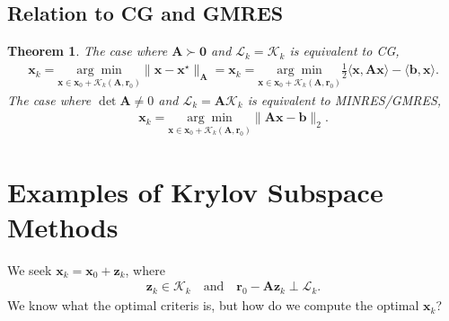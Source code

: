 \documentclass[12pt,a4paper]{article} %
\newtheorem*{theorem}{Theorem}
\begin{document}
\subsection{Relation to CG and GMRES}
\begin{theorem}
    The case where $\mathbf A \succ \bm 0$ and $\mathcal L_k = \mathcal K_k$
    is equivalent to CG, 
    \begin{align*}
        \bm x_k = \underset{\bm x \in \bm x_0 + \mathcal K_k(\mathbf A, \bm r_0)}{\arg \min } \| \bm x - \bm x^\star \|_\mathbf A = \bm x_k = \underset{\bm x \in \bm x_0 + \mathcal K_k(\mathbf A, \bm r_0)}{\arg \min } \frac{1}{2} \langle \bm x, \mathbf A \bm x \rangle - \langle \bm b, \bm x \rangle.
    \end{align*}
    The case where $\det \mathbf A \ne 0$ and $\mathcal L_k = \mathbf A \mathcal K_k$ 
    is equivalent to MINRES/GMRES,
    \begin{align*}
        \bm x_k = \underset{\bm x \in \bm x_0 + \mathcal K_k(\mathbf A, \bm r_0)}{\arg \min } \| \mathbf A \bm x - \bm b \|_2.
    \end{align*}
\end{theorem}


\section{Examples of Krylov Subspace Methods}
We seek
$\bm x_k = \bm x_0 + \bm z_k$, where
\begin{align*}
    \bm{z}_{k} \in \mathcal{K}_{k}
    \quad\text{and}\quad
    \bm{r}_{0}-\mathbf{A} \bm{z}_{k} \perp \mathcal{L}_{k}.
\end{align*}
We know what the optimal criteris is, but how do we compute the optimal $\bm x_k$?
\end{document}
